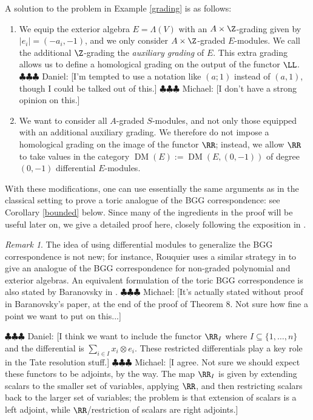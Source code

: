 \documentclass[12pt]{amsart}
\theoremstyle{definition}
\theoremstyle{remark}
\newtheorem{rem}[lemma]{Remark}
\newcommand{\daniel}[1]{{\color{blue} \sf $\clubsuit\clubsuit\clubsuit$ Daniel: [#1]}}
\newcommand{\michael}[1]{{\color{red} \sf $\clubsuit\clubsuit\clubsuit$ Michael: [#1]}}
\def\DM{\operatorname{DM}}
\begin{document}
A solution to the problem in Example \ref{grading} is as follows:
\begin{enumerate}
\item We equip the exterior algebra $E = \Lambda(V)$ with an $A \times \Z$-grading given by $|e_i| = (-a_i, -1)$, and we only consider $A \times \Z$-graded $E$-modules. We call the additional $\Z$-grading the \emph{auxiliary grading} of $E$. This extra grading allows us to define a homological grading on the output of the functor $\LL$. \daniel{I'm tempted to use a notation like $(a;1)$ instead of $(a,1)$, though I could be talked out of this.} \michael{I don't have a strong opinion on this.}
\item We want to consider all $A$-graded $S$-modules, and not only those equipped with an additional auxiliary grading. We therefore do not impose a homological grading on the image of the functor $\RR$; instead, we allow $\RR$ to take values in the category $\DM(E) := \DM(E , (0, -1))$ of degree $(0, -1)$ differential $E$-modules.
\end{enumerate}

With these modifications, one can use essentially the same arguments as in the classical setting to prove a toric analogue of the BGG correspondence: see Corollary \ref{bounded} below. Since many of the ingredients in the proof will be useful later on, we give a detailed proof here, closely following the exposition in \cite[Sections 2 and 3]{EFS}.

\begin{rem}
The idea of using differential modules to generalize the BGG correspondence is not new; for instance, Rouquier uses a similar strategy in \cite[Section 4]{rouquier} to give an analogue of the BGG correspondence for non-graded polynomial and exterior algebras. An equivalent formulation of the toric BGG correspondence is also stated by Baranovsky in \cite{baranovsky}. \michael{It's actually stated without proof in Baranovsky's paper, at the end of the proof of Theorem 8. Not sure how fine a point we want to put on this...}
\end{rem}

\iffalse
 it is stated in the proof of \cite[Theorem 8]{baranovsky} that there is an equivalence of categories between $\Db(S)$ and $\Db(E)$, where $E$ is considered as a dg-algebra with trivial differential and homological grading induced by the ``auxiliary" $\Z$-grading defined above.
\fi

\daniel{I think we want to include the functor $\RR_I$ where $I\subseteq \{1, \dots, n\}$ and the differential is $\sum_{i\in I} x_i\otimes e_i$.  These restricted differentials play a key role in the Tate resolution stuff.} \michael{I agree. Not sure we should expect these functors to be adjoints, by the way. The map $\RR_I$ is given by extending scalars to the smaller set of variables, applying $\RR$, and then restricting scalars back to the larger set of variables; the problem is that extension of scalars is a left adjoint, while $\RR$/restriction of scalars are right adjoints.}
\end{document}
